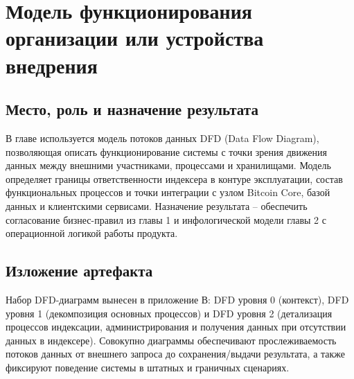 ﻿\documentclass[14pt,a4paper]{extarticle}
\begin{document}
\newpage

\section{Модель функционирования организации или устройства внедрения}

\subsection{Место, роль и назначение результата}
\noindent В главе используется модель потоков данных DFD (Data Flow Diagram), позволяющая описать функционирование системы с точки зрения движения данных между внешними участниками, процессами и хранилищами. Модель определяет границы ответственности индексера в контуре эксплуатации, состав функциональных процессов и точки интеграции с узлом Bitcoin Core, базой данных и клиентскими сервисами. Назначение результата -- обеспечить согласование бизнес-правил из главы 1 и инфологической модели главы 2 с операционной логикой работы продукта.

\subsection{Изложение артефакта}
\noindent Набор DFD-диаграмм вынесен в приложение В: DFD уровня 0 (контекст), DFD уровня 1 (декомпозиция основных процессов) и DFD уровня 2 (детализация процессов индексации, администрирования и получения данных при отсутствии данных в индексере). Совокупно диаграммы обеспечивают прослеживаемость потоков данных от внешнего запроса до сохранения/выдачи результата, а также фиксируют поведение системы в штатных и граничных сценариях.
\end{document}
